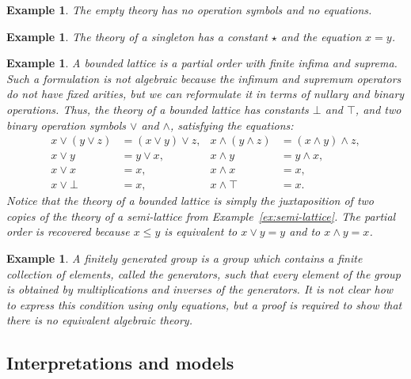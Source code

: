 \documentclass{amsart}
\newtheorem{example}[definition]{Example}
\begin{document}
\begin{example}
  The \emph{empty theory} has no operation symbols and no equations.
\end{example}

\begin{example}
  The theory of a \emph{singleton} has a constant $\star$ and the equation $x = y$.
\end{example}

\begin{example}
  \label{ex:lattice}
  A bounded lattice is a partial order with finite infima and suprema. Such a formulation
  is not algebraic because the infimum and supremum operators do not have fixed arities,
  but we can reformulate it in terms of nullary and binary operations.
  Thus, the theory of a bounded lattice has constants $\bot$ and $\top$, and two binary
  operation symbols $\vee$ and $\wedge$, satisfying the equations:
  \begin{align*}
    x \vee (y \vee z) &= (x \vee y) \vee z,   &      x \wedge (y \wedge z) &= (x \wedge y) \wedge z,\\
    x \vee y &= y \vee x,                     &      x \wedge y &= y \wedge x,\\
    x \vee x &= x,                            &      x \wedge x &= x,\\
    x \vee \bot &= x,                         &      x \wedge \top &= x.
  \end{align*}
  Notice that the theory of a bounded lattice is simply the juxtaposition of two copies of
  the theory of a semi-lattice from Example~\ref{ex:semi-lattice}. The partial order is
  recovered because $x \leq y$ is equivalent to $x \vee y = y$ and to $x \wedge y = x$.
\end{example}

\begin{example}
  \label{ex:finitely-generated-group}
  A \emph{finitely generated group} is a group which contains a finite collection of
  elements, called the \emph{generators}, such that every element of the group is obtained
  by multiplications and inverses of the generators. It is not clear how to express this
  condition using only equations, but a proof is required to show that there is no
  equivalent algebraic theory.
\end{example}


\subsection{Interpretations and models}
\label{sec:interp-and-models}
\end{document}
